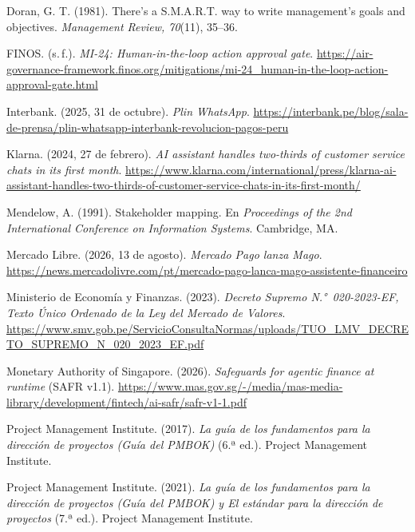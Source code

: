 \documentclass[11pt,a4paper]{article}
\begin{document}
{\begin{list}{}{\setlength{\leftmargin}{1.2em}\setlength{\itemindent}{-1.2em}\setlength{\itemsep}{0.55em}}
\item Doran, G. T. (1981). There's a S.M.A.R.T. way to write management's goals and objectives. \textit{Management Review, 70}(11), 35--36.

\item FINOS. (s.\,f.). \textit{MI-24: Human-in-the-loop action approval gate}. \url{https://air-governance-framework.finos.org/mitigations/mi-24_human-in-the-loop-action-approval-gate.html}

\item Interbank. (2025, 31 de octubre). \textit{Plin WhatsApp}. \url{https://interbank.pe/blog/sala-de-prensa/plin-whatsapp-interbank-revolucion-pagos-peru}

\item Klarna. (2024, 27 de febrero). \textit{AI assistant handles two-thirds of customer service chats in its first month}. \url{https://www.klarna.com/international/press/klarna-ai-assistant-handles-two-thirds-of-customer-service-chats-in-its-first-month/}

\item Mendelow, A. (1991). Stakeholder mapping. En \textit{Proceedings of the 2nd International Conference on Information Systems}. Cambridge, MA.

\item Mercado Libre. (2026, 13 de agosto). \textit{Mercado Pago lanza Mago}. \url{https://news.mercadolivre.com/pt/mercado-pago-lanca-mago-assistente-financeiro}

\item Ministerio de Economía y Finanzas. (2023). \textit{Decreto Supremo N.°~020-2023-EF, Texto Único Ordenado de la Ley del Mercado de Valores}. \url{https://www.smv.gob.pe/ServicioConsultaNormas/uploads/TUO_LMV_DECRETO_SUPREMO_N_020_2023_EF.pdf}

\item Monetary Authority of Singapore. (2026). \textit{Safeguards for agentic finance at runtime} (SAFR v1.1). \url{https://www.mas.gov.sg/-/media/mas-media-library/development/fintech/ai-safr/safr-v1-1.pdf}

\item Project Management Institute. (2017). \textit{La guía de los fundamentos para la dirección de proyectos (Guía del PMBOK)} (6.ª ed.). Project Management Institute.

\item Project Management Institute. (2021). \textit{La guía de los fundamentos para la dirección de proyectos (Guía del PMBOK) y El estándar para la dirección de proyectos} (7.ª ed.). Project Management Institute.


\end{list}}
\end{document}
